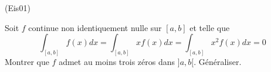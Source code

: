 \begin{tiny}(Eis01)\end{tiny}
Soit $f$ continue non identiquement nulle sur $[a,b]$ et telle que 
\[\int_{[a,b]}f(x)dx = \int_{[a,b]}xf(x)dx = \int_{[a,b]}x^2 f(x)dx = 0\]
Montrer que $f$ admet au moins trois zéros dans $]a,b[$. Généraliser.
